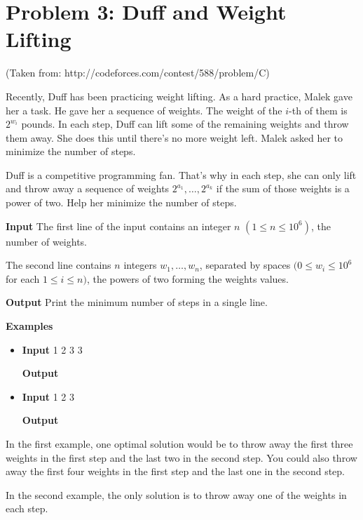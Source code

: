 \normalfont\documentclass[letterpaper,11pt]{article}
\begin{document}
\newpage

\section*{Problem 3: Duff and Weight Lifting}
(Taken from: http://codeforces.com/contest/588/problem/C)

Recently, Duff has been practicing weight lifting. As a hard practice, Malek gave her a task. He gave her a sequence of weights. The weight of the $i$-th of them is $2^{w_i}$ pounds. In each step, Duff can lift some of the remaining weights and throw them away. She does this until there's no more weight left. Malek asked her to minimize the number of steps.

Duff is a competitive programming fan. That's why in each step, she can only lift and throw away a sequence of weights $2^{a_1}, \ldots, 2^{a_k}$ if the sum of those weights is a power of two. Help her minimize the number of steps.

\textbf{Input} \newline
The first line of the input contains an integer $n$ $(1 \leq n \leq 10^6)$, the number of weights.

The second line contains $n$ integers $w_1, \ldots, w_n$, separated by spaces $(0 \leq w_i \leq 10^6$ for each $1 \leq i \leq n)$, the powers of two forming the weights values.

\textbf{Output} \newline
Print the minimum number of steps in a single line. \newline

\textbf{Examples}
\begin{itemize}
\item \textbf{Input}   1 2 3 3

\textbf{Output} 

\item \textbf{Input}   1 2 3

\textbf{Output}  \newline
\end{itemize}

In the first example, one optimal solution would be to throw away the first three weights in the first step and the last two in the second step. You could also throw away the first four weights in the first step and the last one in the second step.

In the second example, the only solution is to throw away one of the weights in each step.
\end{document}
